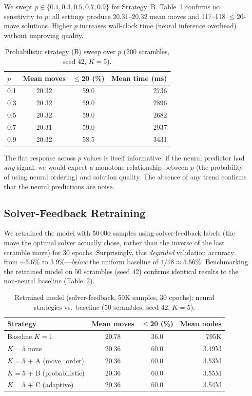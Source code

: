 \documentclass[10pt,twocolumn,a4paper]{article}
\begin{document}
We swept $p \in \{0.1, 0.3, 0.5, 0.7, 0.9\}$ for Strategy~B. Table~\ref{tab:probsweep} confirms no sensitivity to $p$: all settings produce 20.31--20.32 mean moves and 117--118 $\leq$20-move solutions. Higher $p$ increases wall-clock time (neural inference overhead) without improving quality.

\begin{table}[t]
\centering
\caption{Probabilistic strategy (B) sweep over $p$ (200 scrambles, seed 42, $K{=}5$).}
\label{tab:probsweep}
\begin{tabular}{@{}lccr@{}}
\toprule
$p$ & \textbf{Mean moves} & \textbf{$\leq$20 (\%)} & \textbf{Mean time (ms)} \\
\midrule
0.1 & 20.32 & 59.0 & 2736 \\
0.3 & 20.32 & 59.0 & 2896 \\
0.5 & 20.32 & 59.0 & 2682 \\
0.7 & 20.31 & 59.0 & 2937 \\
0.9 & 20.32 & 58.5 & 3431 \\
\bottomrule
\end{tabular}
\end{table}

The flat response across $p$ values is itself informative: if the neural predictor had \emph{any} signal, we would expect a monotone relationship between $p$ (the probability of using neural ordering) and solution quality. The absence of any trend confirms that the neural predictions are noise.

\subsection{Solver-Feedback Retraining}
\label{sec:retrained}

We retrained the model with 50\,000 samples using solver-feedback labels (the move the optimal solver actually chose, rather than the inverse of the last scramble move) for 30 epochs. Surprisingly, this \emph{degraded} validation accuracy from $\sim$5.6\% to 3.9\%---\emph{below} the uniform baseline of $1/18 \approx 5.56\%$. Benchmarking the retrained model on 50 scrambles (seed 42) confirms identical results to the non-neural baseline (Table~\ref{tab:retrained}).

\begin{table}[t]
\centering
\caption{Retrained model (solver-feedback, 50K samples, 30 epochs): neural strategies vs.\ baseline (50 scrambles, seed 42, $K{=}5$).}
\label{tab:retrained}
\begin{tabular}{@{}lccr@{}}
\toprule
\textbf{Strategy} & \textbf{Mean moves} & \textbf{$\leq$20 (\%)} & \textbf{Mean nodes} \\
\midrule
Baseline $K{=}1$ & 20.78 & 36.0 & 795K \\
$K{=}5$ none & 20.36 & 60.0 & 3.49M \\
$K{=}5$ + A (move\_order) & 20.36 & 60.0 & 3.53M \\
$K{=}5$ + B (probabilistic) & 20.36 & 60.0 & 3.55M \\
$K{=}5$ + C (adaptive) & 20.36 & 60.0 & 3.54M \\
\bottomrule
\end{tabular}
\end{table}
\end{document}
